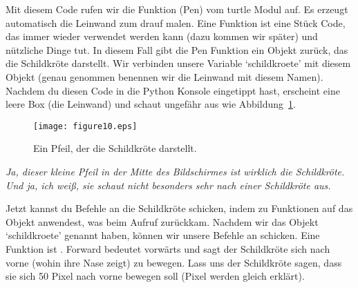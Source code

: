Mit diesem Code rufen wir die Funktion (Pen) vom turtle Modul auf. Es erzeugt automatisch die Leinwand zum drauf malen. Eine Funktion ist eine Stück Code, das immer wieder verwendet werden kann (dazu kommen wir später) und nützliche Dinge tut. In diesem Fall gibt die Pen Funktion ein Objekt zurück, das die Schildkröte darstellt. Wir verbinden unsere Variable `schildkroete' mit diesem Objekt (genau genommen benennen wir die Leinwand mit diesem Namen). Nachdem du diesen Code in die Python Konsole eingetippt hast, erscheint eine leere Box (die Leinwand) und schaut ungefähr aus wie Abbildung~\ref{fig10}.


\begin{figure}
\begin{center}
\texttt{[image: figure10.eps]}
\end{center}
\caption{Ein Pfeil, der die Schildkröte darstellt.}\label{fig10}
\end{figure}

\emph{Ja, dieser kleine Pfeil in der Mitte des Bildschirmes ist wirklich die Schildkröte. Und ja, ich weiß, sie schaut nicht besonders sehr nach einer Schildkröte aus.}


Jetzt kannst du Befehle an die Schildkröte schicken, indem zu Funktionen auf das Objekt anwendest, was beim  Aufruf zurückkam. Nachdem wir das Objekt `schildkroete' genannt haben, können wir unsere Befehle an  schicken.
Eine Funktion ist  . Forward bedeutet vorwärts und sagt der Schildkröte sich nach vorne (wohin ihre Nase zeigt) zu bewegen. Lass uns der Schildkröte sagen, dass sie sich 50 Pixel nach vorne bewegen soll (Pixel werden gleich erklärt).

